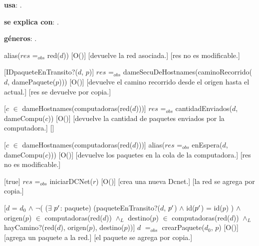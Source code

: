 \begin{Interfaz}

  \textbf{usa}: .
  
  \textbf{se explica con}: .

  \textbf{g\'eneros}: .


  {alias($res$ =$_{obs}$ red($d$))}%
  [O()]
  [devuelve la red asociada.]
  [res no es modificable.]

  [IDpaqueteEnTransito?($d$, $p$)]
  {$res$ =$_{obs}$ dameSecuDeHostnames(caminoRecorrido($d$, damePaquete($p$)))}%
  [O()]
  [devuelve el camino recorrido desde el origen hasta el actual.]
  [res se devuelve por copia.]
  
  [$c$ $\in$ dameHostnames(computadoras(red($d$)))]
  {$res$ =$_{obs}$ cantidadEnviados($d$, dameCompu($c$))}%
  [O()]
  [devuelve la cantidad de paquetes enviados por la computadora.]
  []

  [$c$ $\in$ dameHostnames(computadoras(red($d$)))]
  {alias($res$ =$_{obs}$ enEspera($d$, dameCompu($c$)))}%
  [O()]
  [devuelve los paquetes en la cola de la computadora.]
  [res no es modificable.]
  
  [true]
  {$res$ =$_{obs}$ iniciarDCNet($r$)}%
  [O()]
  [crea una nueva Dcnet.]
  [la red se agrega por copia.]
    
  [$d$ = $d_0$ $\wedge$ $\neg$( ($\exists$ $p\sp{\prime}$: paquete) (paqueteEnTransito?($d$, $p\sp{\prime}$) $\wedge$ id($p\sp{\prime}$) = id($p$) ) $\wedge$ \newline
  origen($p$) $\in$ computadoras(red($d$)) $\wedge_L$ destino($p$) $\in$ computadoras(red($d$)) $\wedge_L$ hayCamino?(red($d$), origen($p$), destino($p$))]
  {$d$ $=_{obs}$ crearPaquete($d_0$, $p$)}%
  [O()]
  [agrega un paquete a la red.]
  [el paquete se agrega por copia.]

\newpage


\end{Interfaz}
